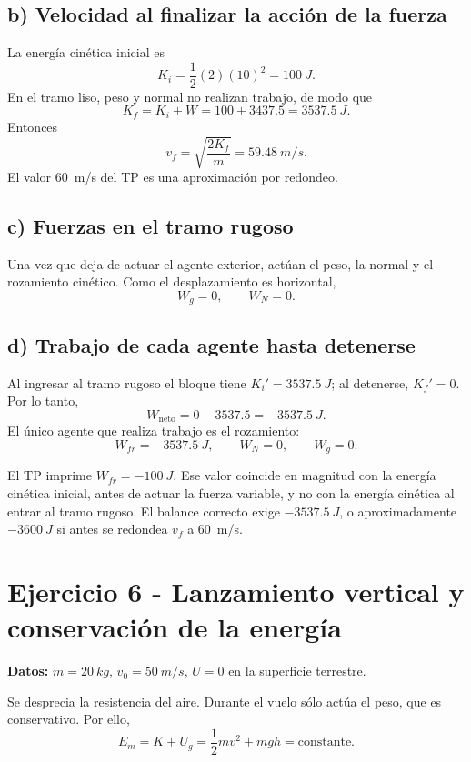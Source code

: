 \documentclass[11pt,a4paper]{article}
\begin{document}
\subsection*{b) Velocidad al finalizar la acción de la fuerza}
La energía cinética inicial es
\[
K_i=\frac12(2)(10)^2=\SI{100}{J}.
\]
En el tramo liso, peso y normal no realizan trabajo, de modo que
\[
K_f=K_i+W=100+3437.5=\SI{3537.5}{J}.
\]
Entonces
\[
v_f=\sqrt{\frac{2K_f}{m}}=\boxed{\SI{59.48}{m/s}}.
\]
El valor \SI{60}{m/s} del TP es una aproximación por redondeo.

\subsection*{c) Fuerzas en el tramo rugoso}
Una vez que deja de actuar el agente exterior, actúan el peso, la normal y el rozamiento cinético. Como el desplazamiento es horizontal,
\[
W_g=0,\qquad W_N=0.
\]

\subsection*{d) Trabajo de cada agente hasta detenerse}
Al ingresar al tramo rugoso el bloque tiene \(K_i'=\SI{3537.5}{J}\); al detenerse, \(K_f'=0\). Por lo tanto,
\[
W_{\mathrm{neto}}=0-3537.5=-\SI{3537.5}{J}.
\]
El único agente que realiza trabajo es el rozamiento:
\[
\boxed{W_{fr}=-\SI{3537.5}{J}},\qquad W_N=0,\qquad W_g=0.
\]

\begin{alerta}
El TP imprime \(W_{fr}=-\SI{100}{J}\). Ese valor coincide en magnitud con la energía cinética inicial, antes de actuar la fuerza variable, y no con la energía cinética al entrar al tramo rugoso. El balance correcto exige \(-\SI{3537.5}{J}\), o aproximadamente \(-\SI{3600}{J}\) si antes se redondea \(v_f\) a \SI{60}{m/s}.
\end{alerta}

\section{Ejercicio 6 - Lanzamiento vertical y conservación de la energía}
\textbf{Datos:} \(m=\SI{20}{kg}\), \(v_0=\SI{50}{m/s}\), \(U=0\) en la superficie terrestre.

\begin{metodo}
Se desprecia la resistencia del aire. Durante el vuelo sólo actúa el peso, que es conservativo. Por ello,
\[
E_m=K+U_g=\frac12mv^2+mgh=\text{constante}.
\]
\end{metodo}
\end{document}
